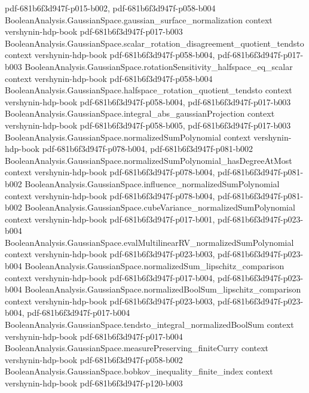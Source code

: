 \begin{theorem}
  {pdf-681b6f3d947f-p015-b002,
    pdf-681b6f3d947f-p058-b004}
\proofstep
  {BooleanAnalysis.GaussianSpace.gaussian_surface_normalization}
  {context}
  {vershynin-hdp-book}
  {pdf-681b6f3d947f-p017-b003}
\proofstep
  {BooleanAnalysis.GaussianSpace.scalar_rotation_disagreement_quotient_tendsto}
  {context}
  {vershynin-hdp-book}
  {pdf-681b6f3d947f-p058-b004,
    pdf-681b6f3d947f-p017-b003}
\proofstep
  {BooleanAnalysis.GaussianSpace.rotationSensitivity_halfspace_eq_scalar}
  {context}
  {vershynin-hdp-book}
  {pdf-681b6f3d947f-p058-b004}
\proofstep
  {BooleanAnalysis.GaussianSpace.halfspace_rotation_quotient_tendsto}
  {context}
  {vershynin-hdp-book}
  {pdf-681b6f3d947f-p058-b004,
    pdf-681b6f3d947f-p017-b003}
\proofstep
  {BooleanAnalysis.GaussianSpace.integral_abs_gaussianProjection}
  {context}
  {vershynin-hdp-book}
  {pdf-681b6f3d947f-p058-b005,
    pdf-681b6f3d947f-p017-b003}
\proofstep
  {BooleanAnalysis.GaussianSpace.normalizedSumPolynomial}
  {context}
  {vershynin-hdp-book}
  {pdf-681b6f3d947f-p078-b004,
    pdf-681b6f3d947f-p081-b002}
\proofstep
  {BooleanAnalysis.GaussianSpace.normalizedSumPolynomial_hasDegreeAtMost}
  {context}
  {vershynin-hdp-book}
  {pdf-681b6f3d947f-p078-b004,
    pdf-681b6f3d947f-p081-b002}
\proofstep
  {BooleanAnalysis.GaussianSpace.influence_normalizedSumPolynomial}
  {context}
  {vershynin-hdp-book}
  {pdf-681b6f3d947f-p078-b004,
    pdf-681b6f3d947f-p081-b002}
\proofstep
  {BooleanAnalysis.GaussianSpace.cubeVariance_normalizedSumPolynomial}
  {context}
  {vershynin-hdp-book}
  {pdf-681b6f3d947f-p017-b001,
    pdf-681b6f3d947f-p023-b004}
\proofstep
  {BooleanAnalysis.GaussianSpace.evalMultilinearRV_normalizedSumPolynomial}
  {context}
  {vershynin-hdp-book}
  {pdf-681b6f3d947f-p023-b003,
    pdf-681b6f3d947f-p023-b004}
\proofstep
  {BooleanAnalysis.GaussianSpace.normalizedSum_lipschitz_comparison}
  {context}
  {vershynin-hdp-book}
  {pdf-681b6f3d947f-p017-b004,
    pdf-681b6f3d947f-p023-b004}
\proofstep
  {BooleanAnalysis.GaussianSpace.normalizedBoolSum_lipschitz_comparison}
  {context}
  {vershynin-hdp-book}
  {pdf-681b6f3d947f-p023-b003,
    pdf-681b6f3d947f-p023-b004,
    pdf-681b6f3d947f-p017-b004}
\proofstep
  {BooleanAnalysis.GaussianSpace.tendsto_integral_normalizedBoolSum}
  {context}
  {vershynin-hdp-book}
  {pdf-681b6f3d947f-p017-b004}
\proofstep
  {BooleanAnalysis.GaussianSpace.measurePreserving_finiteCurry}
  {context}
  {vershynin-hdp-book}
  {pdf-681b6f3d947f-p058-b002}
\proofstep
  {BooleanAnalysis.GaussianSpace.bobkov_inequality_finite_index}
  {context}
  {vershynin-hdp-book}
  {pdf-681b6f3d947f-p120-b003}

\end{theorem}
